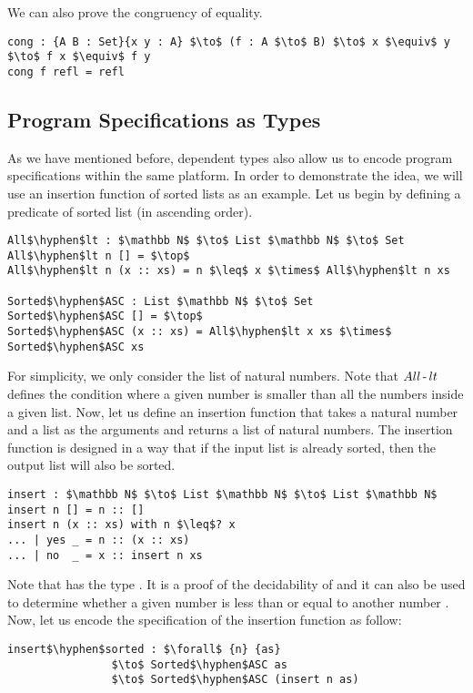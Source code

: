 \par We can also prove the congruency of equality.
\begin{lstlisting}[mathescape=true,xleftmargin=.3\textwidth]
cong : {A B : Set}{x y : A} $\to$ (f : A $\to$ B) $\to$ x $\equiv$ y $\to$ f x $\equiv$ f y
cong f refl = refl
\end{lstlisting}


\subsection{Program Specifications as Types}
\par As we have mentioned before, dependent types also allow us to encode program
specifications within the same platform. In order to demonstrate the
idea, we will use an insertion function of sorted lists as an
example. Let us begin by defining a predicate
of sorted list (in ascending order). 
\begin{lstlisting}[mathescape=true,xleftmargin=.3\textwidth]
All$\hyphen$lt : $\mathbb N$ $\to$ List $\mathbb N$ $\to$ Set
All$\hyphen$lt n [] = $\top$
All$\hyphen$lt n (x :: xs) = n $\leq$ x $\times$ All$\hyphen$lt n xs

Sorted$\hyphen$ASC : List $\mathbb N$ $\to$ Set
Sorted$\hyphen$ASC [] = $\top$
Sorted$\hyphen$ASC (x :: xs) = All$\hyphen$lt x xs $\times$ Sorted$\hyphen$ASC xs
\end{lstlisting}

\par For simplicity, we only consider the list of natural
numbers. Note that \(All\operatorname{-} lt\) defines the condition where a given
number is smaller than all the numbers inside a given list. Now, let
us define an insertion function that takes a natural number and a list as the arguments and returns a list of
natural numbers. The insertion function is designed in a way that if the
input list is already sorted, then the output list will also be sorted. 
\begin{lstlisting}[mathescape=true,xleftmargin=.3\textwidth]
insert : $\mathbb N$ $\to$ List $\mathbb N$ $\to$ List $\mathbb N$
insert n [] = n :: []
insert n (x :: xs) with n $\leq$? x
... | yes _ = n :: (x :: xs)
... | no  _ = x :: insert n xs
\end{lstlisting}

\par Note that  has the type . It is a proof of the decidability of \mb{\_\leq\_} and it can also be used to determine whether
a given number  is less than or equal to another number
. Now, let us encode the specification of the insertion function
as follow: 
\begin{lstlisting}[mathescape=true,xleftmargin=.3\textwidth]
insert$\hyphen$sorted : $\forall$ {n} {as} 
                $\to$ Sorted$\hyphen$ASC as 
                $\to$ Sorted$\hyphen$ASC (insert n as)
\end{lstlisting}


